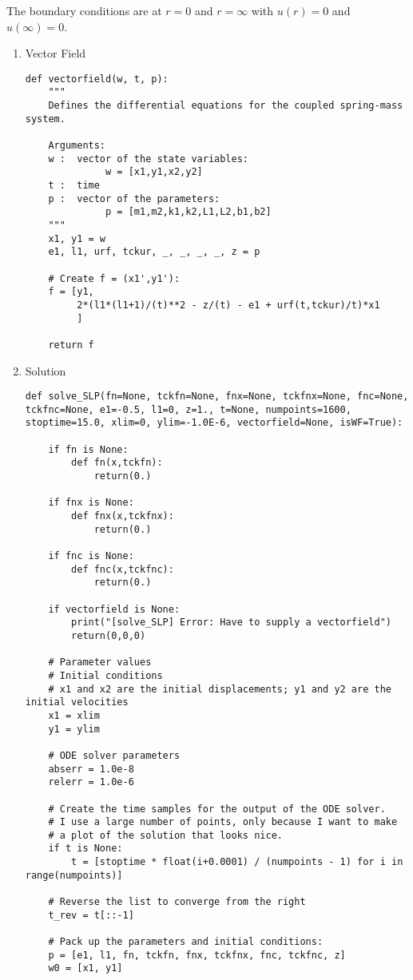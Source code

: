 \documentclass[11pt,a4paper]{article}
\begin{document}
The boundary conditions are at \(r=0\) and \(r=\infty\) with
\(u(r)=0\) and \(u(\infty)=0\).

\begin{enumerate}
\item Vector Field
\label{sec:org1bc9098}
\begin{verbatim}
def vectorfield(w, t, p):
    """
    Defines the differential equations for the coupled spring-mass system.

    Arguments:
    w :  vector of the state variables:
              w = [x1,y1,x2,y2]
    t :  time
    p :  vector of the parameters:
              p = [m1,m2,k1,k2,L1,L2,b1,b2]
    """
    x1, y1 = w
    e1, l1, urf, tckur, _, _, _, _, z = p

    # Create f = (x1',y1'):
    f = [y1,
         2*(l1*(l1+1)/(t)**2 - z/(t) - e1 + urf(t,tckur)/t)*x1
         ]

    return f
\end{verbatim}
\item Solution
\label{sec:org07ab579}
\begin{verbatim}
def solve_SLP(fn=None, tckfn=None, fnx=None, tckfnx=None, fnc=None, tckfnc=None, e1=-0.5, l1=0, z=1., t=None, numpoints=1600, stoptime=15.0, xlim=0, ylim=-1.0E-6, vectorfield=None, isWF=True):

    if fn is None:
        def fn(x,tckfn):
            return(0.)

    if fnx is None:
        def fnx(x,tckfnx):
            return(0.)

    if fnc is None:
        def fnc(x,tckfnc):
            return(0.)

    if vectorfield is None:
        print("[solve_SLP] Error: Have to supply a vectorfield")
        return(0,0,0)

    # Parameter values
    # Initial conditions
    # x1 and x2 are the initial displacements; y1 and y2 are the initial velocities
    x1 = xlim
    y1 = ylim

    # ODE solver parameters
    abserr = 1.0e-8
    relerr = 1.0e-6

    # Create the time samples for the output of the ODE solver.
    # I use a large number of points, only because I want to make
    # a plot of the solution that looks nice.
    if t is None:
        t = [stoptime * float(i+0.0001) / (numpoints - 1) for i in range(numpoints)]

    # Reverse the list to converge from the right
    t_rev = t[::-1]

    # Pack up the parameters and initial conditions:
    p = [e1, l1, fn, tckfn, fnx, tckfnx, fnc, tckfnc, z]
    w0 = [x1, y1]


\end{verbatim}
\end{enumerate}
\end{document}
